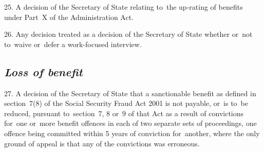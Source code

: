 \documentclass[12pt,a4paper]{article}
\begin{document}
25.  A decision of the Secretary of State relating to~the up-rating of benefits under Part~X of the Administration Act.

26.  Any decision treated as a decision of the Secretary of State whether or~not to~waive or~defer a work-focused interview.


\subsection*{\itshape Loss of benefit}

27.  A decision of the Secretary of State that a sanctionable benefit as defined in section~7(8) of the Social Security Fraud Act 2001 is not payable, or~is to~be reduced, pursuant to~section~7, 8 or~9 of that Act as a result of convictions for~one or~more benefit offences in each of two separate sets of proceedings, one offence being committed within 
5 years  %
of conviction for~another, where the only ground of appeal is that any of the convictions was erroneous.

\end{document}
